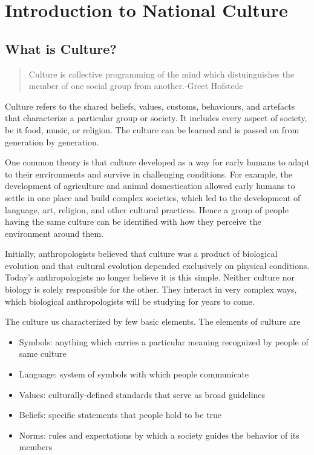 \documentclass[12pt]{article}
\begin{document}
\newpage
\tableofcontents
\newpage
\listoffigures
\newpage
\listoftables

\newpage
\section{Introduction to National Culture}
\subsection{What is Culture?}
\begin{quote}
    Culture is collective programming of the mind which distuinguishes the member of one social group from another.\hfill -Greet Hofstede
\end{quote}

Culture refers to the shared beliefs, values, customs, behaviours, and artefacts that characterize a particular group or society. It includes every aspect of society, be it food, music, or religion. The culture can be learned and is passed on from generation by generation.

One common theory is that culture developed as a way for early humans to adapt to their environments and survive in challenging conditions. For example, the development of agriculture and animal domestication allowed early humans to settle in one place and build complex societies, which led to the development of language, art, religion, and other cultural practices. Hence a group of people having the same culture can be identified with how they perceive the environment around them.

Initially, anthropologists believed that culture was a product of biological evolution and that cultural evolution depended exclusively on physical conditions. Today’s anthropologists no longer believe it is this simple. Neither culture nor biology is solely responsible for the other. They interact in very complex ways, which biological anthropologists will be studying for years to come.

The culture us characterized by few basic elements. The elements of culture are
\begin{itemize}
    \item Symbols: anything which carries a particular meaning recognized by people of same culture
    \item Language: system of symbols with which people communicate
    \item Values: culturally-defined standards that serve as broad guidelines
    \item Beliefs: specific statements that people hold to be true
    \item Norms: rules and expectations by which a society guides the behavior of its members
\end{itemize}
\end{document}
